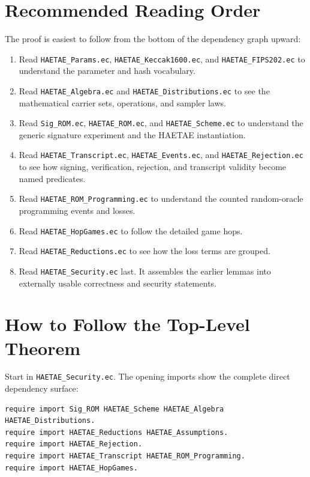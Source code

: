 \documentclass[11pt]{article}
\newcommand{\file}[1]{\nolinkurl{#1}}
\begin{document}
\section{Recommended Reading Order}

The proof is easiest to follow from the bottom of the dependency graph upward:

\begin{enumerate}[leftmargin=*]
  \item Read \file{HAETAE_Params.ec}, \file{HAETAE_Keccak1600.ec}, and
  \file{HAETAE_FIPS202.ec} to understand the parameter and hash vocabulary.
  \item Read \file{HAETAE_Algebra.ec} and \file{HAETAE_Distributions.ec} to see
  the mathematical carrier sets, operations, and sampler laws.
  \item Read \file{Sig_ROM.ec}, \file{HAETAE_ROM.ec}, and
  \file{HAETAE_Scheme.ec} to understand the generic signature experiment and
  the HAETAE instantiation.
  \item Read \file{HAETAE_Transcript.ec}, \file{HAETAE_Events.ec}, and
  \file{HAETAE_Rejection.ec} to see how signing, verification, rejection, and
  transcript validity become named predicates.
  \item Read \file{HAETAE_ROM_Programming.ec} to understand the counted
  random-oracle programming events and losses.
  \item Read \file{HAETAE_HopGames.ec} to follow the detailed game hops.
  \item Read \file{HAETAE_Reductions.ec} to see how the loss terms are grouped.
  \item Read \file{HAETAE_Security.ec} last.  It assembles the earlier lemmas
  into externally usable correctness and security statements.
\end{enumerate}

\section{How to Follow the Top-Level Theorem}

Start in \file{HAETAE_Security.ec}.  The opening imports show the complete
direct dependency surface:

\begin{lstlisting}[language=EasyCrypt]
require import Sig_ROM HAETAE_Scheme HAETAE_Algebra HAETAE_Distributions.
require import HAETAE_Reductions HAETAE_Assumptions.
require import HAETAE_Rejection.
require import HAETAE_Transcript HAETAE_ROM_Programming.
require import HAETAE_HopGames.
\end{lstlisting}
\end{document}
